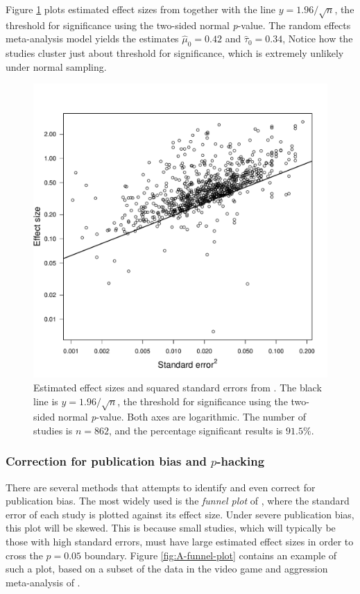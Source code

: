 Figure \ref{fig:motyl} plots estimated effect sizes from \textcite{Motyl2017-dx} together with the line $y=1.96/\sqrt{n}$, the threshold for significance using the two-sided normal \emph{p}-value. The random effects meta-analysis model yields the estimates $\hat{\mu}_{0}=0.42$ and $\hat{\tau}_{0}=0.34$, Notice how the studies cluster just about threshold for significance, which is extremely unlikely
under normal sampling.
\begin{figure}
\noindent \begin{centering}
\includegraphics[scale=0.5]{chunks/motyl}
\par\end{centering}
\caption{\label{fig:motyl}Estimated effect sizes and squared standard errors from \textcite{Motyl2017-dx}. The black line is $y=1.96/\sqrt{n}$, the threshold for significance using the two-sided normal \emph{p}-value. Both axes are logarithmic. The number of studies is $n=862$, and the percentage significant results is $91.5\%$.}
\end{figure}
\subsubsection{Correction for publication bias and $p$-hacking}

There are several methods that attempts to identify and even correct for publication bias. The most widely used is the \emph{funnel plot} of \textcite{Egger1998-kj}, where the standard error of each study is plotted against its effect size. Under severe publication bias, this plot will be skewed. This is because small studies, which will
typically be those with high standard errors, must have large estimated
effect sizes in order to cross the $p=0.05$ boundary. Figure \ref{fig:A-funnel-plot} contains an example of such a plot, based on a subset of the data in the video game and aggression meta-analysis of \textcite{Anderson2010-ki}.

